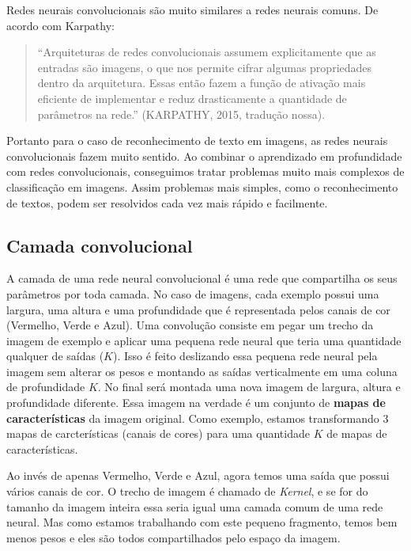 Redes neurais convolucionais são muito similares a redes neurais
comuns. De acordo com Karpathy\cite{Karpathy}:
\begin{quote}
  ``Arquiteturas de redes convolucionais assumem explicitamente que as
  entradas são imagens, o que nos permite cifrar algumas propriedades
  dentro da arquitetura. Essas então fazem a função de ativação mais
  eficiente de implementar e reduz drasticamente a quantidade de
  parâmetros na rede.'' (KARPATHY, 2015, tradução nossa).
\end{quote}

Portanto para o caso de reconhecimento de texto em imagens, as redes
neurais convolucionais fazem muito sentido. Ao combinar o aprendizado
em profundidade com redes convolucionais, conseguimos tratar problemas
muito mais complexos de classificação em imagens. Assim problemas mais
simples, como o reconhecimento de textos, podem ser resolvidos cada
vez mais rápido e facilmente.

\subsection{Camada convolucional}

A camada de uma rede neural convolucional é uma rede que compartilha
os seus parâmetros por toda camada. No caso de imagens, cada exemplo
possui uma largura, uma altura e uma profundidade que é representada
pelos canais de cor (Vermelho, Verde e Azul). Uma convolução consiste
em pegar um trecho da imagem de exemplo e aplicar uma pequena rede
neural que teria uma quantidade qualquer de saídas ($K$). Isso é feito
deslizando essa pequena rede neural pela imagem sem alterar os pesos e
montando as saídas verticalmente em uma coluna de profundidade $K$. No
final será montada uma nova imagem de largura, altura e profundidade
diferente. Essa imagem na verdade é um conjunto de {\bf mapas de
  características} da imagem original. Como exemplo, estamos
transformando 3 mapas de carcterísticas (canais de cores) para uma
quantidade $K$ de mapas de características.

Ao invés de apenas Vermelho, Verde e Azul, agora temos uma saída que
possui vários canais de cor. O trecho de imagem é chamado de
\textit{Kernel}, e se for do tamanho da imagem inteira essa seria
igual uma camada comum de uma rede neural. Mas como estamos
trabalhando com este pequeno fragmento, temos bem menos pesos e eles
são todos compartilhados pelo espaço da imagem.

